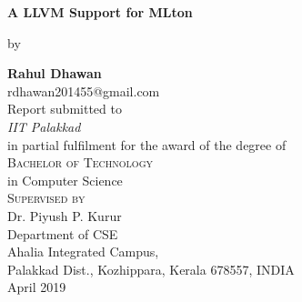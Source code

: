 \documentclass[openany]{book}
\begin{document}
\begin{titlepage}
\begin{center}
 {\huge\bfseries A LLVM Support for MLton \\}
 
 \vspace{1.5cm}
 by
 \vspace{0.02cm}
 
 \vspace{1.0cm}
 {\Large\bfseries Rahul Dhawan}\\[5pt]
 rdhawan201455@gmail.com\\[14pt]
 \vspace{2cm}
{Report  submitted to} \\[5pt]
\emph{{IIT Palakkad}}\\[2cm]
{in partial fulfilment for the award of the degree
 of} \\[2cm]
\textsc{\Large{{Bachelor of Technology }}} \\[5pt]
{in Computer Science} \vspace{0.4cm} \\[1cm]

\textsc{\Large{{Supervised by}}}   \\[5pt]
{Dr. Piyush P. Kurur} \vspace{0.4cm} \\[2cm]

 \vfill
{Department of CSE}\\[5pt]
{Ahalia Integrated Campus,}\\[5pt]
{ Palakkad Dist., Kozhippara, Kerala 678557,
 INDIA}\\
 \vfill
{April 2019}
\end{center}
\end{titlepage}
\end{document}
